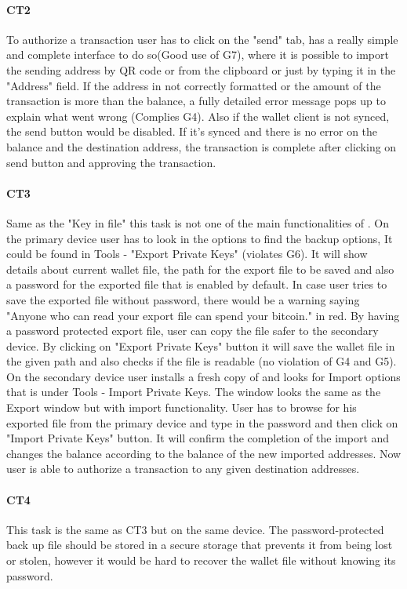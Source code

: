 \paragraph{CT2} To authorize a transaction user has to click on the "send" tab, \multibit has a really simple and complete interface to do so(Good use of G7), where it is possible to import the sending address by QR code or from the clipboard or just by typing it in the "Address" field. If the address in not correctly formatted or the amount of the transaction is more than the balance, a fully detailed error message pops up to explain what went wrong (Complies G4). Also if the wallet client is not synced, the send button would be disabled. If it's synced and there is no error on the balance and the destination address, the transaction is complete after clicking on send button and approving the transaction.

\paragraph{CT3} Same as the "Key in file" this task is not one of the main functionalities of \multibit. On the primary device user has to look in the options to find the backup options, It could be found in Tools - "Export Private Keys" (violates G6). It will show details about current wallet file, the path for the export file to be saved and also a password for the exported file that is enabled by default. In case user tries to save the exported file without password, there would be a warning saying "Anyone who can read your export file can spend your bitcoin." in red. By having a password protected export file, user can copy the file safer to the secondary device. By clicking on "Export Private Keys" button it will save the wallet file in the given path and also checks if the file is readable (no violation of G4 and G5). On the secondary device user installs a fresh copy of \multibit and looks for Import options that is under Tools - Import Private Keys. The window looks the same as the Export window but with import functionality. User has to browse for his exported file from the primary device and type in the password and then click on "Import Private Keys" button. It will confirm the completion of the import and changes the balance according to the balance of the new imported addresses. Now user is able to authorize a transaction to any given destination addresses.

\paragraph{CT4} This task is the same as CT3 but on the same device. The password-protected back up file should be stored in a secure storage that prevents it from being lost or stolen, however it would be hard to recover the wallet file without knowing its password. 

